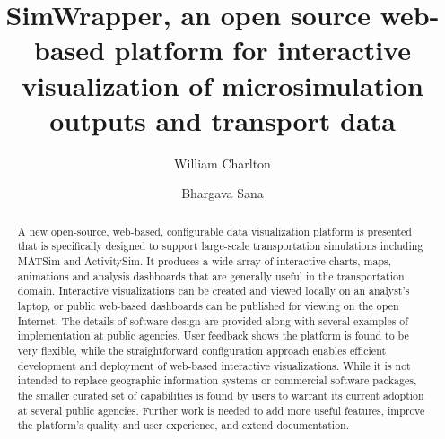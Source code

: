 \documentclass[3p,times,procedia]{elsarticle}
\begin{document}
\begin{frontmatter}



%

\title{SimWrapper, an open source web-based platform for interactive visualization of microsimulation outputs and transport data}

\author[a]{William Charlton}
\author[b]{Bhargava Sana}

\address[a]{Technische Universität Berlin, Chair of Transport Systems Planning and Transport Telematics, Straße des 17. Juni 135, 10623 Berlin, Germany}
\address[b]{San Diego Association of Governments, 401 B Street, Unit 800, San Diego, CA 92101, United States}

\begin{abstract}
A new open-source, web-based, configurable data visualization platform is presented that is specifically designed to support large-scale transportation simulations including MATSim and ActivitySim. It produces a wide array of interactive charts, maps, animations and analysis dashboards that are generally useful in the transportation domain. Interactive visualizations can be created and viewed locally on an analyst's laptop, or public web-based dashboards can be published for viewing on the open Internet. The details of software design are provided along with several examples of implementation at public agencies. User feedback shows the platform is found to be very flexible, while the straightforward configuration approach enables efficient development and deployment of web-based interactive visualizations. While it is not intended to replace geographic information systems or commercial software packages, the smaller curated set of capabilities is found by users to warrant its current adoption at several public agencies. Further work is needed to add more useful features, improve the platform's quality and user experience, and extend documentation.


\end{abstract}
\end{frontmatter}
\end{document}
